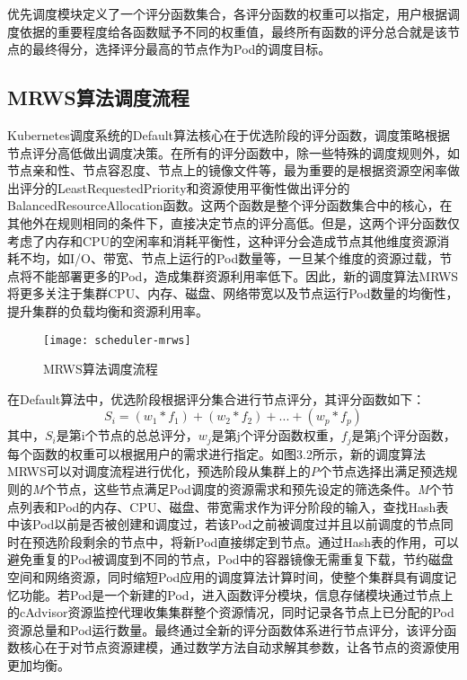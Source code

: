 优先调度模块定义了一个评分函数集合，各评分函数的权重可以指定，用户根据调度依据的重要程度给各函数赋予不同的权重值，最终所有函数的评分总合就是该节点的最终得分，选择评分最高的节点作为Pod的调度目标。

\subsection{MRWS算法调度流程}
Kubernetes调度系统的Default算法核心在于优选阶段的评分函数，调度策略根据节点评分高低做出调度决策。在所有的评分函数中，除一些特殊的调度规则外，如节点亲和性、节点容忍度、节点上的镜像文件等，最为重要的是根据资源空闲率做出评分的LeastRequestedPriority和资源使用平衡性做出评分的BalancedResourceAllocation函数。这两个函数是整个评分函数集合中的核心，在其他外在规则相同的条件下，直接决定节点的评分高低。但是，这两个评分函数仅考虑了内存和CPU的空闲率和消耗平衡性，这种评分会造成节点其他维度资源消耗不均，如I/O、带宽、节点上运行的Pod数量等，一旦某个维度的资源过载，节点将不能部署更多的Pod，造成集群资源利用率低下。因此，新的调度算法MRWS将更多关注于集群CPU、内存、磁盘、网络带宽以及节点运行Pod数量的均衡性，提升集群的负载均衡和资源利用率。
\begin{figure}[H] %
	\centering
	\texttt{[image: scheduler-mrws]}
	\caption{MRWS算法调度流程}
	\label{fig:xfig1}
\end{figure}
在Default算法中，优选阶段根据评分集合进行节点评分，其评分函数如下：
\begin{equation}
	S_{i} = (w_{1}*f_{1})+(w_{2}*f_{2})+...+(w_{p}*f_{p})
\end{equation}
其中，\begin{math}S_{i}\end{math}是第i个节点的总总评分，\begin{math}w_{j}\end{math}是第j个评分函数权重，\begin{math}f_{j}\end{math}是第j个评分函数，每个函数的权重可以根据用户的需求进行指定。如图3.2所示，新的调度算法MRWS可以对调度流程进行优化，预选阶段从集群上的\emph{P}个节点选择出满足预选规则的\emph{M}个节点，这些节点满足Pod调度的资源需求和预先设定的筛选条件。\emph{M}个节点列表和Pod的内存、CPU、磁盘、带宽需求作为评分阶段的输入，查找Hash表中该Pod以前是否被创建和调度过，若该Pod之前被调度过并且以前调度的节点同时在预选阶段剩余的节点中，将新Pod直接绑定到节点。通过Hash表的作用，可以避免重复的Pod被调度到不同的节点，Pod中的容器镜像无需重复下载，节约磁盘空间和网络资源，同时缩短Pod应用的调度算法计算时间，使整个集群具有调度记忆功能。若Pod是一个新建的Pod，进入函数评分模块，信息存储模块通过节点上的cAdvisor资源监控代理收集集群整个资源情况，同时记录各节点上已分配的Pod资源总量和Pod运行数量。最终通过全新的评分函数体系进行节点评分，该评分函数核心在于对节点资源建模，通过数学方法自动求解其参数，让各节点的资源使用更加均衡。

